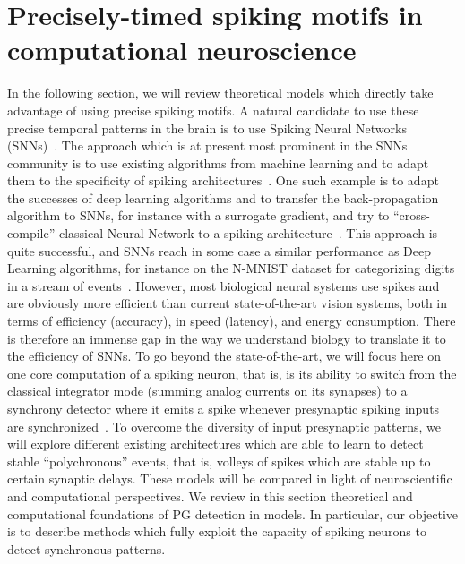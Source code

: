 \documentclass[brainsci, %
               review,submit,pdftex,moreauthors
               ]{Definitions/mdpi}
\begin{document}
\section{Precisely-timed spiking motifs in computational neuroscience}
In the following section, we will review theoretical models which directly take advantage of using precise spiking motifs. 
A natural candidate to use these precise temporal patterns in the brain is to use Spiking Neural Networks (SNNs)~\citep{maass_networks_1997}. The approach which is at present most prominent in the SNNs community is to use existing algorithms from machine learning and to adapt them to the specificity of spiking architectures~\citep{goltz_fast_2021}. One such example is to adapt the successes of deep learning algorithms and to transfer the back-propagation algorithm to SNNs, for instance with a surrogate gradient, and try to ``cross-compile'' classical Neural Network to a spiking architecture~\citep{rueckauer_conversion_2017}. This approach is quite successful, and SNNs reach in some case a similar performance as Deep Learning algorithms, for instance on the N-MNIST dataset for categorizing digits in a stream of events~\citep{susi_nmnsd-spiking_2021}. However, most biological neural systems use spikes and are obviously more efficient than current state-of-the-art vision systems, both in terms of efficiency (accuracy), in speed (latency), and energy consumption. There is therefore an immense gap in the way we understand biology to translate it to the efficiency of SNNs.  To go beyond the state-of-the-art, we will focus here on one core computation of a spiking neuron, that is, is its ability to switch from the classical integrator mode (summing analog currents on its synapses) to a synchrony detector where it emits a spike whenever presynaptic spiking inputs are synchronized~\citep{abeles_role_1982,paugam-moisy_computing_2012}. To overcome the diversity of input presynaptic patterns, we will explore different existing architectures which are able to learn to detect stable ``polychronous'' events, that is, volleys of spikes which are stable up to certain synaptic delays. These models will be compared in light of neuroscientific and computational perspectives. We review in this section theoretical and computational foundations of PG detection in models. In particular, our objective is to describe methods which fully exploit the capacity of spiking neurons to detect synchronous patterns.
\end{document}
